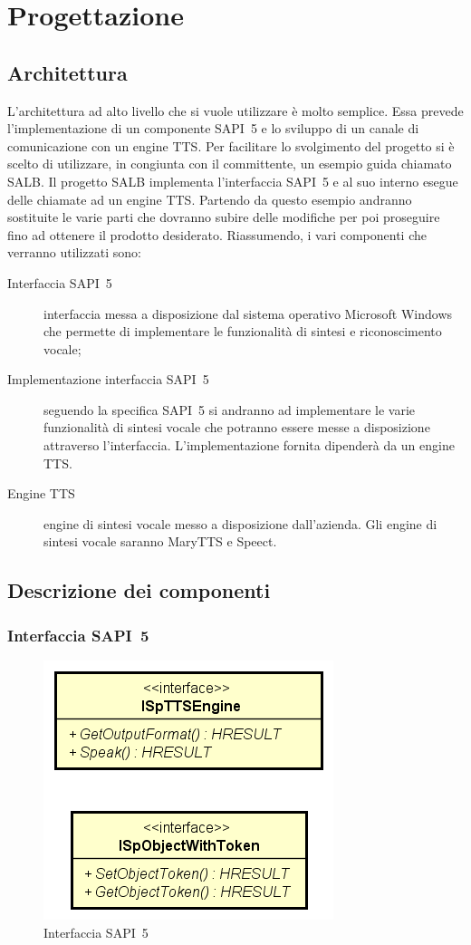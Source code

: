 \chapter{Progettazione} %
\thispagestyle{empty}

\newpage
\section{Architettura}
L'architettura ad alto livello che si vuole utilizzare è molto semplice. Essa prevede l'implementazione di un componente SAPI~5 e lo sviluppo di un canale di comunicazione con un engine TTS.
Per facilitare lo svolgimento del progetto si è scelto di utilizzare, in congiunta con il committente, un esempio guida chiamato SALB.
Il progetto SALB implementa l'interfaccia SAPI~5 e al suo interno esegue delle chiamate ad un engine TTS.
Partendo da questo esempio andranno sostituite le varie parti che dovranno subire delle modifiche per poi proseguire fino ad ottenere il prodotto desiderato.
Riassumendo, i vari componenti che verranno utilizzati sono:
\begin{description}
	\item[Interfaccia SAPI~5] interfaccia messa a disposizione dal sistema operativo Microsoft Windows che permette di implementare le funzionalità di sintesi e riconoscimento vocale;
	\item[Implementazione interfaccia SAPI~5] seguendo la specifica SAPI~5 si andranno ad implementare le varie funzionalità di sintesi vocale che potranno essere messe a disposizione attraverso l'interfaccia. L'implementazione fornita dipenderà da un engine TTS.
	\item[Engine TTS] engine di sintesi vocale messo a disposizione dall'azienda. Gli engine di sintesi vocale saranno MaryTTS e Speect.
\end{description}
\newpage

\section{Descrizione dei componenti}
	\subsection{Interfaccia SAPI~5}
	  \begin{figure}[H]
	  	\centering
	  	\includegraphics{images/sapi5-interface.png}
	  	\caption{Interfaccia SAPI~5}
	  \end{figure}
 
